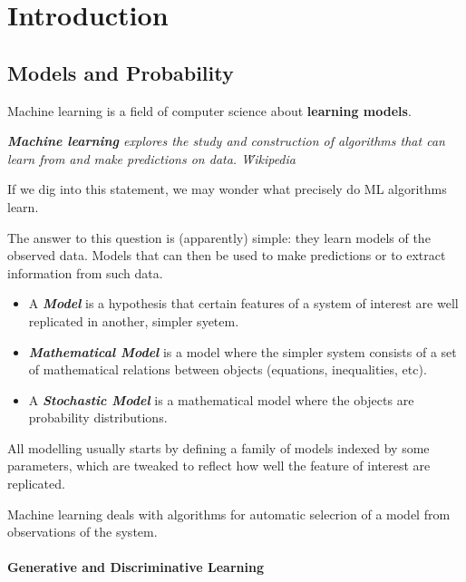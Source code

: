 
\chapter{Introduction}

\section{Models and Probability}

Machine learning is a field of computer science about \textbf{learning models}.

\begin{definitionblock}
    \textit{\textbf{Machine learning} explores the study and construction of algorithms that can learn from and make predictions on data. \hfill \~ Wikipedia}
\end{definitionblock}


If we dig into this statement, we may wonder what precisely do ML algorithms learn.

The answer to this question is (apparently) simple: they learn models of
the observed data. Models that can then be used to make predictions or
to extract information from such data.

\begin{definitionblock}[Model]
    \begin{itemize}
        \item A \textbf{\textit{Model}} is a hypothesis that certain features of a system of interest are well replicated in another, simpler syetem.
        
        \item \textbf{\textit{Mathematical Model}} is a model where the simpler system consists of a set of mathematical relations between objects (equations, inequalities, etc).
        
        \item A \textbf{\textit{Stochastic Model}} is a mathematical model where the objects are probability distributions.
    \end{itemize}
\end{definitionblock}

All modelling usually starts by defining a family of models indexed by some parameters, which are tweaked to reflect how well the feature of interest are replicated.

Machine learning deals with algorithms for automatic selecrion of a model from observations of the system.

\subsubsection{Generative and Discriminative Learning}

